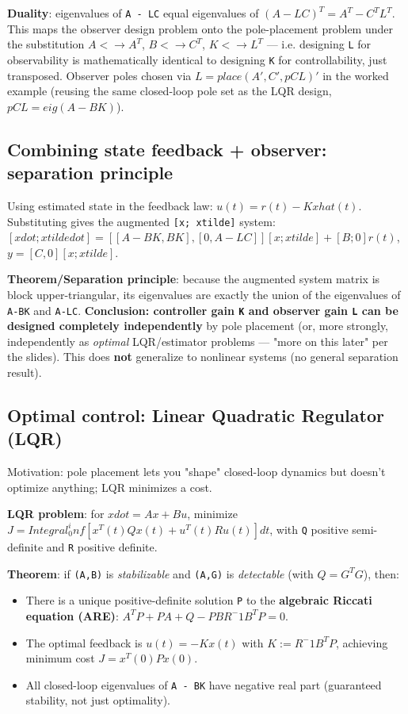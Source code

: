 \documentclass[11pt]{article}
\begin{document}
\textbf{Duality}: eigenvalues of \texttt{A - LC} equal eigenvalues of $(A-LC)^T = A^T - C^T L^T$. This maps the observer design problem onto the pole-placement problem under the substitution $A <\to  A^T$, $B <\to  C^T$, $K <\to  L^T$ — i.e. designing \texttt{L} for observability is mathematically identical to designing \texttt{K} for controllability, just transposed. Observer poles chosen via $L = place(A', C', pCL)'$ in the worked example (reusing the same closed-loop pole set as the LQR design, $pCL = eig(A-B K)$).

\subsection{Combining state feedback + observer: separation principle}
Using estimated state in the feedback law: $u(t) = r(t) - K xhat(t)$. Substituting gives the augmented \texttt{[x; xtilde]} system:
$[xdot; xtildedot] = [[A-BK, BK],[0, A-LC]] [x; xtilde] + [B;0] r(t)$, $y = [C, 0][x; xtilde]$.

\textbf{Theorem/Separation principle}: because the augmented system matrix is block upper-triangular, its eigenvalues are exactly the union of the eigenvalues of \texttt{A-BK} and \texttt{A-LC}. \textbf{Conclusion: controller gain \texttt{K} and observer gain \texttt{L} can be designed completely independently} by pole placement (or, more strongly, independently as \textit{optimal} LQR/estimator problems — "more on this later" per the slides). This does \textbf{not} generalize to nonlinear systems (no general separation result).

\subsection{Optimal control: Linear Quadratic Regulator (LQR)}
Motivation: pole placement lets you "shape" closed-loop dynamics but doesn't optimize anything; LQR minimizes a cost.

\textbf{LQR problem}: for $xdot=Ax+Bu$, minimize $J = Integral_0^inf [x^T(t) Q x(t) + u^T(t) R u(t)] dt$, with \texttt{Q} positive semi-definite and \texttt{R} positive definite.

\textbf{Theorem}: if \texttt{(A,B)} is \textit{stabilizable} and \texttt{(A,G)} is \textit{detectable} (with $Q = G^T G$), then:
\begin{itemize}
\item There is a unique positive-definite solution \texttt{P} to the \textbf{algebraic Riccati equation (ARE)}: $A^T P + P A + Q - P B R^-1 B^T P = 0$.
\item The optimal feedback is $u(t) = -Kx(t)$ with $K := R^-1 B^T P$, achieving minimum cost $J = x^T(0) P x(0)$.
\item All closed-loop eigenvalues of \texttt{A - BK} have negative real part (guaranteed stability, not just optimality).
\end{itemize}
\end{document}
